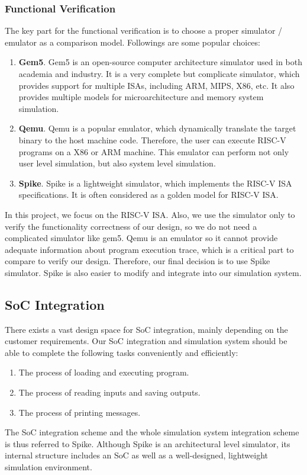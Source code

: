 \subsubsection{Functional Verification}
The key part for the functional verification is to choose a proper simulator / emulator as a comparison model. Followings are some popular choices:
\begin{enumerate}
    \item \textbf{Gem5}. Gem5 is an open-source computer architecture simulator used in both academia and industry. It is a very complete but complicate simulator, which provides support for multiple ISAs, including ARM, MIPS, X86, etc. It also provides multiple models for microarchitecture and memory system simulation.
    \item \textbf{Qemu}. Qemu is a popular emulator, which dynamically translate the target binary to the host machine code. Therefore, the user can execute RISC-V programs on a X86 or ARM machine. This emulator can perform not only user level simulation, but also system level simulation.
    \item \textbf{Spike}. Spike is a lightweight simulator, which implements the RISC-V ISA specifications. It is often considered as a golden model for RISC-V ISA.
\end{enumerate}

In this project, we focus on the RISC-V ISA. Also, we use the simulator only to verify the functionality correctness of our design, so we do not need a complicated simulator like gem5. Qemu is an emulator so it cannot provide adequate information about program execution trace, which is a critical part to compare to verify our design. Therefore, our final decision is to use Spike simulator. Spike is also easier to modify and integrate into our simulation system.


\subsection{SoC Integration}
There exists a vast design space for SoC integration, mainly depending on the customer requirements. Our SoC integration and simulation system should be able to complete the following tasks conveniently and efficiently:
\begin{enumerate}
    \item The process of loading and executing program.
    \item The process of reading inputs and saving outputs.
    \item The process of printing messages.
\end{enumerate}
The SoC integration scheme and the whole simulation system integration scheme is thus referred to Spike. Although Spike is an architectural level simulator, its internal structure includes an SoC as well as a well-designed, lightweight simulation environment.


